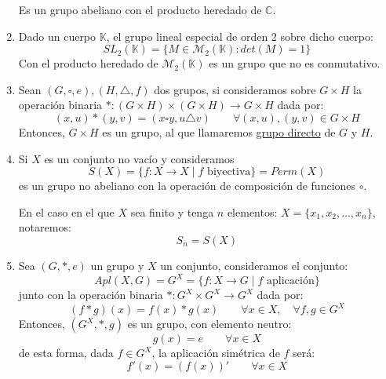 \begin{ejemplo}
\begin{enumerate}
             Es un grupo abeliano con el producto heredado de $\mathbb{C}$.
         \item Dado un cuerpo $\mathbb{K}$, el grupo lineal especial de orden 2 sobre dicho cuerpo:
             \begin{equation*}
                 SL_2(\mathbb{K}) = \{M\in \mathcal{M}_2(\mathbb{K}) : det(M) = 1\}
             \end{equation*}
             Con el producto heredado de $\mathcal{M}_2(\mathbb{K})$ es un grupo que no es conmutativo.
         \item Sean $(G,\square,e),(H,\triangle,f)$ dos grupos, si consideramos sobre $G\times H$ la operación binaria $\ast:(G\times H)\times(G\times H)\rightarrow G\times H$  dada por:
             \begin{equation*}
                 (x,u) \ast (y,v) = (x\square y, u\triangle v) \qquad \forall (x,u),(y,v)\in G\times H
             \end{equation*}
             Entonces, $G\times H$ es un grupo, al que llamaremos \underline{grupo directo} de $G$ y $H$.
         \item Si $X$ es un conjunto no vacío y consideramos
             \begin{equation*}
                 S(X) = \{f:X\rightarrow X \mid f \text{\ biyectiva}\} = Perm(X)
             \end{equation*}
             es un grupo no abeliano con la operación de composición de funciones $\circ$.

             En el caso en el que $X$ sea finito y tenga $n$ elementos: $X = \{x_1, x_2, \ldots, x_n\}$, notaremos:
             \begin{equation*}
                 S_n = S(X)
             \end{equation*}
         \item Sea $(G,\ast,e)$ un grupo y $X$ un conjunto, consideramos el conjunto:
             \begin{equation*}
                 Apl(X,G) = G^X = \{f:X\rightarrow G \mid f \text{\ aplicación}\}
             \end{equation*}
             junto con la operación binaria $\ast:G^X\times G^X \rightarrow G^X$ dada por:
             \begin{equation*}
                 (f\ast g)(x) = f(x)\ast g(x) \qquad \forall x\in X, \quad \forall f,g\in G^X
             \end{equation*}
             Entonces, $(G^X, \ast, g)$ es un grupo, con elemento neutro:
             \begin{equation*}
                 g(x) = e \qquad \forall x\in X
             \end{equation*}
             de esta forma, dada $f\in G^X$, la aplicación simétrica de $f$ será:
             \begin{equation*}
                 f'(x) = {(f(x))}' \qquad \forall x\in X
             \end{equation*}


\end{enumerate}
\end{ejemplo}
